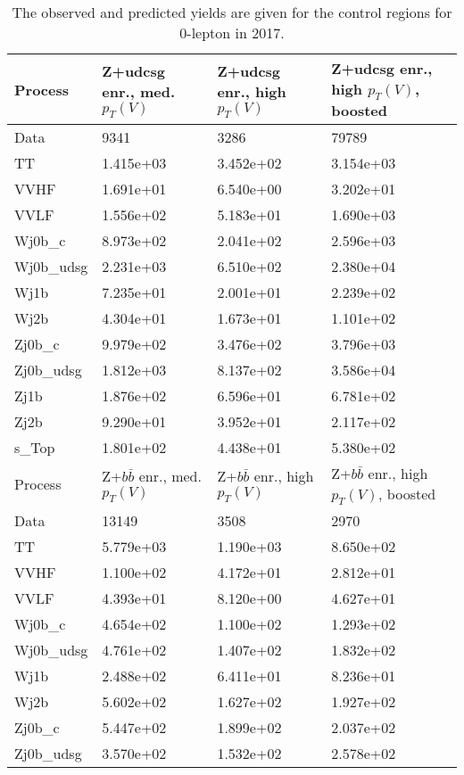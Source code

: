 \begin{table}
\centering
\caption[2017 0-lepton control region yields]{
                  The observed and predicted yields are given for the
                  control regions for 0-lepton in 2017.
                  }
{\footnotesize
\begin{tabularx}{0.8\textwidth}{|X|X|X|X|}
\hline
Process & Z+udcsg enr., med. $p_{T}(V)$ & Z+udcsg enr., high $p_{T}(V)$ & Z+udcsg enr., high $p_{T}(V)$, boosted \\
\hline
Data & 9341 & 3286 & 79789 \\
\hline
TT & 1.415e+03 & 3.452e+02 & 3.154e+03 \\
VVHF & 1.691e+01 & 6.540e+00 & 3.202e+01 \\
VVLF & 1.556e+02 & 5.183e+01 & 1.690e+03 \\
Wj0b\_c & 8.973e+02 & 2.041e+02 & 2.596e+03 \\
Wj0b\_udsg & 2.231e+03 & 6.510e+02 & 2.380e+04 \\
Wj1b & 7.235e+01 & 2.001e+01 & 2.239e+02 \\
Wj2b & 4.304e+01 & 1.673e+01 & 1.101e+02 \\
Zj0b\_c & 9.979e+02 & 3.476e+02 & 3.796e+03 \\
Zj0b\_udsg & 1.812e+03 & 8.137e+02 & 3.586e+04 \\
Zj1b & 1.876e+02 & 6.596e+01 & 6.781e+02 \\
Zj2b & 9.290e+01 & 3.952e+01 & 2.117e+02 \\
s\_Top & 1.801e+02 & 4.438e+01 & 5.380e+02 \\
\hline
\hline
Process & Z+$b\bar{b}$ enr., med. $p_{T}(V)$ & Z+$b\bar{b}$ enr., high $p_{T}(V)$ & Z+$b\bar{b}$ enr., high $p_{T}(V)$, boosted \\
\hline
Data & 13149 & 3508 & 2970 \\
\hline
TT & 5.779e+03 & 1.190e+03 & 8.650e+02 \\
VVHF & 1.100e+02 & 4.172e+01 & 2.812e+01 \\
VVLF & 4.393e+01 & 8.120e+00 & 4.627e+01 \\
Wj0b\_c & 4.654e+02 & 1.100e+02 & 1.293e+02 \\
Wj0b\_udsg & 4.761e+02 & 1.407e+02 & 1.832e+02 \\
Wj1b & 2.488e+02 & 6.411e+01 & 8.236e+01 \\
Wj2b & 5.602e+02 & 1.627e+02 & 1.927e+02 \\
Zj0b\_c & 5.447e+02 & 1.899e+02 & 2.037e+02 \\
Zj0b\_udsg & 3.570e+02 & 1.532e+02 & 2.578e+02 \\

\end{tabularx}}
\end{table}
